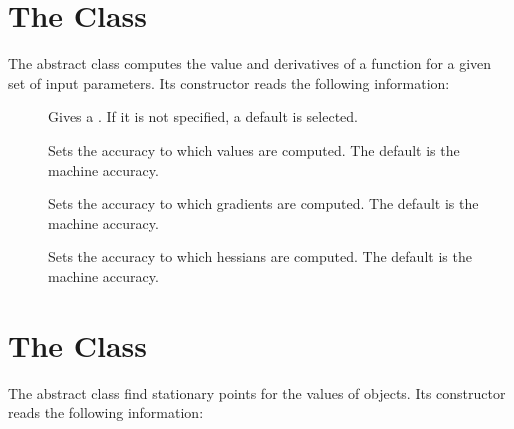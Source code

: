 

\section{The  Class}\label{Function}

The  abstract class computes the value and
derivatives of a function for a given set of input
parameters.  Its  constructor reads the
following information:

\begin{description}
  \item[] Gives a 
    .  If it is not specified, a default
     is selected.

  \item[] Sets the accuracy to which values are
    computed.  The default is the machine accuracy.

  \item[] Sets the accuracy to which gradients
    are computed.  The default is the machine accuracy.

  \item[] Sets the accuracy to which hessians are
    computed.  The default is the machine accuracy.

\end{description}


\section{The  Class}\label{Optimize}

The  abstract class find stationary points for the values
of  objects.  Its  constructor reads
the following information:

